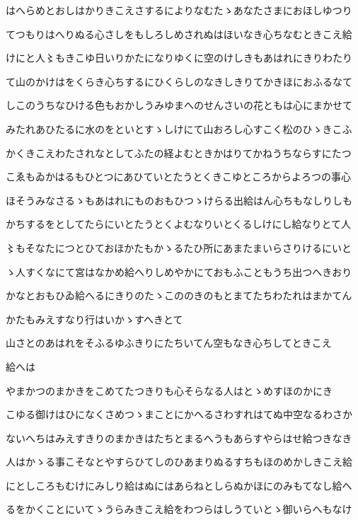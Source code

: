 \documentclass[a4paper,11pt,landscape]{ltjtarticle}
\begin{document}
はへらめとおしはかりきこえさするによりなむたゝあなたさまにおほしゆつり
\par\medskip
てつもりはへりぬる心さしをもしろしめされぬはほいなき心ちなむときこえ給
\par\medskip
けにと人〻もきこゆ日いりかたになりゆくに空のけしきもあはれにきりわたり
\par\medskip
て山のかけはをくらき心ちするにひくらしのなきしきりてかきほにおふるなて
\par\medskip
しこのうちなひける色もおかしうみゆまへのせんさいの花ともは心にまかせて
\par\medskip
みたれあひたるに水のをといとすゝしけにて山おろし心すこく松のひゝきこふ
\par\medskip
かくきこえわたされなとしてふたの経よむときかはりてかねうちならすにたつ
\par\medskip
こゑもゐかはるもひとつにあひていとたうとくきこゆところからよろつの事心
\par\medskip
ほそうみなさるゝもあはれにものおもひつゝけらる出給はん心ちもなしりしも
\par\medskip
かちするをとしてたらにいとたうとくよむなりいとくるしけにし給なりとて人
\par\medskip
〻もそなたにつとひておほかたもかゝるたひ所にあまたまいらさりけるにいと
\par\medskip
ゝ人すくなにて宮はなかめ給へりしめやかにておもふこともうち出つへきおり
\par\medskip
かなとおもひゐ給へるにきりのたゝこののきのもとまてたちわたれはまかてん
\par\medskip
かたもみえすなり行はいかゝすへきとて
\par\medskip
山さとのあはれをそふるゆふきりにたちいてん空もなき心ちしてときこえ
\par\medskip
給へは
\par\medskip
やまかつのまかきをこめてたつきりも心そらなる人はとゝめすほのかにき
\par\medskip
こゆる御けはひになくさめつゝまことにかへるさわすれはてぬ中空なるわさか
\par\medskip
ないへちはみえすきりのまかきはたちとまるへうもあらすやらはせ給つきなき
\par\medskip
人はかゝる事こそなとやすらひてしのひあまりぬるすちもほのめかしきこえ給
\par\medskip
にとしころもむけにみしり給はぬにはあらねとしらぬかほにのみもてなし給へ
\par\medskip
るをかくことにいてゝうらみきこえ給をわつらはしうていとゝ御いらへもなけ
\par\medskip
\end{document}

